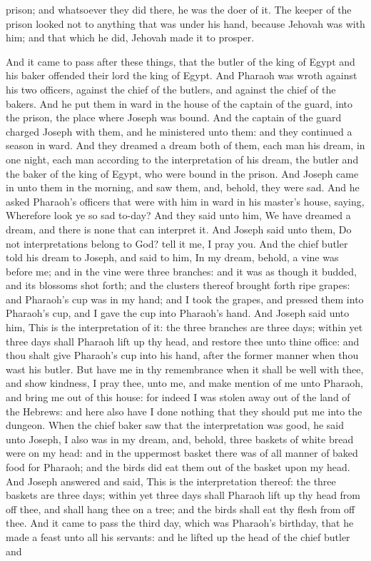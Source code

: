 prison; and whatsoever they did there, he was the doer of it. The keeper of the prison looked not to anything that was under his hand, because Jehovah was with him; and that which he did, Jehovah made it to prosper. 

And it came to pass after these things, that the butler of the king of Egypt and his baker offended their lord the king of Egypt. And Pharaoh was wroth against his two officers, against the chief of the butlers, and against the chief of the bakers. And he put them in ward in the house of the captain of the guard, into the prison, the place where Joseph was bound. And the captain of the guard charged Joseph with them, and he ministered unto them: and they continued a season in ward. And they dreamed a dream both of them, each man his dream, in one night, each man according to the interpretation of his dream, the butler and the baker of the king of Egypt, who were bound in the prison. And Joseph came in unto them in the morning, and saw them, and, behold, they were sad. And he asked Pharaoh’s officers that were with him in ward in his master’s house, saying, Wherefore look ye so sad to-day? And they said unto him, We have dreamed a dream, and there is none that can interpret it. And Joseph said unto them, Do not interpretations belong to God? tell it me, I pray you.  And the chief butler told his dream to Joseph, and said to him, In my dream, behold, a vine was before me; and in the vine were three branches: and it was as though it budded, and its blossoms shot forth; and the clusters thereof brought forth ripe grapes: and Pharaoh’s cup was in my hand; and I took the grapes, and pressed them into Pharaoh’s cup, and I gave the cup into Pharaoh’s hand. And Joseph said unto him, This is the interpretation of it: the three branches are three days; within yet three days shall Pharaoh lift up thy head, and restore thee unto thine office: and thou shalt give Pharaoh’s cup into his hand, after the former manner when thou wast his butler. But have me in thy remembrance when it shall be well with thee, and show kindness, I pray thee, unto me, and make mention of me unto Pharaoh, and bring me out of this house: for indeed I was stolen away out of the land of the Hebrews: and here also have I done nothing that they should put me into the dungeon.  When the chief baker saw that the interpretation was good, he said unto Joseph, I also was in my dream, and, behold, three baskets of white bread were on my head: and in the uppermost basket there was of all manner of baked food for Pharaoh; and the birds did eat them out of the basket upon my head. And Joseph answered and said, This is the interpretation thereof: the three baskets are three days; within yet three days shall Pharaoh lift up thy head from off thee, and shall hang thee on a tree; and the birds shall eat thy flesh from off thee. And it came to pass the third day, which was Pharaoh’s birthday, that he made a feast unto all his servants: and he lifted up the head of the chief butler and 